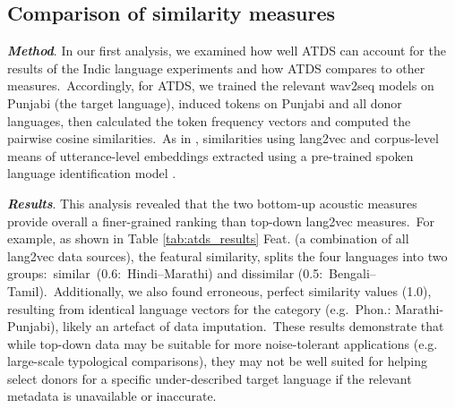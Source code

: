 \documentclass[main.tex]{subfiles}
\begin{document}
\newpage


\subsection{Comparison of similarity measures}

\textbf{\textit{Method}}. In our first analysis, we examined how well ATDS can account for the results of the Indic language experiments and how ATDS compares to other measures.~Accordingly, for ATDS, we trained the relevant wav2seq models on Punjabi (the target language), induced tokens on Punjabi and all donor languages, then calculated the token frequency vectors and computed the pairwise cosine similarities.~As in \textcite{9688276},  similarities using lang2vec and corpus-level means of utterance-level embeddings extracted using a pre-trained spoken language identification model \parencite[SpeechBrain:][]{ravanelli2021speechbrain}.

\noindent{}\textbf{\textit{Results}}. This analysis revealed that the two bottom-up acoustic measures provide overall a finer-grained ranking than top-down lang2vec measures.~For example, as shown in Table \ref{tab:atds_results} Feat. (a combination of all lang2vec data sources), the featural similarity, splits the four languages into two groups:~similar~(0.6:~Hindi--Marathi) and dissimilar (0.5:~Bengali--Tamil).~Additionally, we also found erroneous, perfect similarity values (1.0), resulting from identical language vectors for the category (e.g.~Phon.: Marathi-Punjabi), likely an artefact of data imputation.~These results demonstrate that while top-down data may be suitable for more noise-tolerant applications (e.g. large-scale typological comparisons), they may not be well suited for helping select donors for a specific under-described target language if the relevant metadata is unavailable or inaccurate.
\end{document}
